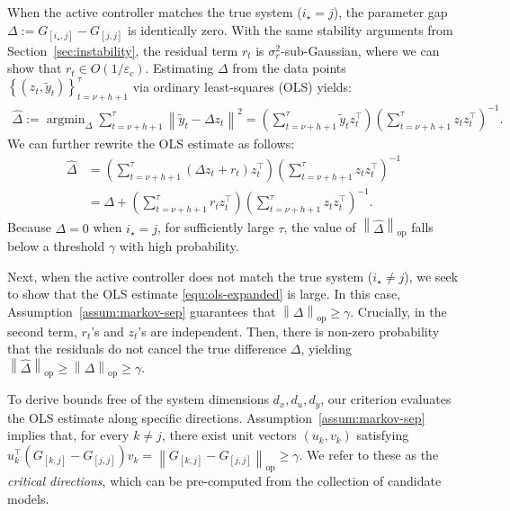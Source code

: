 \documentclass[11pt, twoside]{article}
\theoremstyle{definition}
\newcommand{\norm}[1]{\left\lVert #1 \right\rVert}
\newcommand{\argmin}{\mathop{\mathrm{argmin}}}
\newcommand{\opnorm}[1]{\norm{#1}_{\mathrm{op}}}
\begin{document}
When the active controller matches the true system ($i_\star = j$), the parameter gap $\Delta := G_{[i_\star, j]} - G_{[j, j]}$ is identically zero. 
With the same stability arguments from Section~\ref{sec:instability}, the residual term $r_t$ is $\sigma_r^2$-sub-Gaussian, where we can show that $r_t \in O(1/\varepsilon_c)$.
Estimating $\Delta$ from the data points $\left\{(z_t, \widetilde{y}_t)\right\}_{t=\nu+h+1}^{\tau}$ via ordinary least-squares (OLS) yields:
\begin{align*}
    \widehat\Delta 
    := \argmin_\Delta \sum_{t=\nu+h+1}^{\tau} \norm{\widetilde{y}_t - \Delta z_t}^2
    = \left(\sum_{t=\nu+h+1}^{\tau} \widetilde{y}_t z_t^\top\right) \left(\sum_{t=\nu+h+1}^{\tau} z_t z_t^\top\right)^{-1}.
\end{align*}
We can further rewrite the OLS estimate as follows:
\begin{equation}
\label{equ:ols-expanded}
\begin{aligned}
    \widehat\Delta 
&= \left(\sum_{t=\nu+h+1}^{\tau} (\Delta z_t + r_t) z_t^\top\right) \left(\sum_{t=\nu+h+1}^{\tau} z_t z_t^\top\right)^{-1} \\
    &= \Delta + \left(\sum_{t=\nu+h+1}^{\tau} r_t z_t^\top\right) \left(\sum_{t=\nu+h+1}^{\tau} z_t z_t^\top\right)^{-1}.
\end{aligned}
\end{equation}
Because $\Delta = 0$ when $i_\star = j$, for sufficiently large $\tau$, the value of $\opnorm{\widehat\Delta}$ falls below a threshold $\gamma$ with high probability.

Next, when the active controller does not match the true system ($i_\star \neq j$), we seek to show that the OLS estimate \eqref{equ:ols-expanded} is large.
In this case, Assumption~\ref{assum:markov-sep} guarantees that $\opnorm{\Delta} \ge \gamma$.
Crucially, in the second term, $r_t$'s and $z_t$'s are independent.
Then, there is non-zero probability that the residuals do not cancel the true difference $\Delta$, yielding $\opnorm{\widehat\Delta} \ge \opnorm{\Delta} \ge \gamma$.

To derive bounds free of the system dimensions $d_x, d_u, d_y$, our criterion evaluates the OLS estimate along specific directions.
Assumption~\ref{assum:markov-sep} implies that, for every $k \neq j$, there exist unit vectors $(u_k, v_k)$ satisfying $u_k^\top (G_{[k, j]} - G_{[j, j]}) v_k = \opnorm{G_{[k, j]} - G_{[j, j]}} \ge \gamma$.
We refer to these as the \textit{critical directions}, which can be pre-computed from the collection of candidate models.
\end{document}
